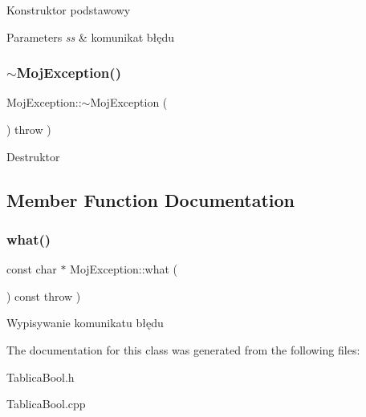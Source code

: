 Konstruktor podstawowy 
\begin{DoxyParams}{Parameters}
{\em ss} & komunikat błędu \\
\hline
\end{DoxyParams}
\mbox{\label{class_moj_exception_a1a494fd16d1ede4c5eadf2d91fbad5ab}} 
\subsubsection{\texorpdfstring{$\sim$\+Moj\+Exception()}{~MojException()}}
{\footnotesize\ttfamily Moj\+Exception\+::$\sim$\+Moj\+Exception (\begin{DoxyParamCaption}{ }\end{DoxyParamCaption}) throw  ) \hspace{0.3cm}{\ttfamily [virtual]}}

Destruktor 

\subsection{Member Function Documentation}
\mbox{\label{class_moj_exception_a1a01fa0b60ed0200566ea9bdf3401dba}} 
\subsubsection{\texorpdfstring{what()}{what()}}
{\footnotesize\ttfamily const char $\ast$ Moj\+Exception\+::what (\begin{DoxyParamCaption}{ }\end{DoxyParamCaption}) const throw  ) \hspace{0.3cm}{\ttfamily [virtual]}}

Wypisywanie komunikatu błędu 

The documentation for this class was generated from the following files\+:\begin{DoxyCompactItemize}
\item 
Tablica\+Bool.\+h\item 
Tablica\+Bool.\+cpp\end{DoxyCompactItemize}
